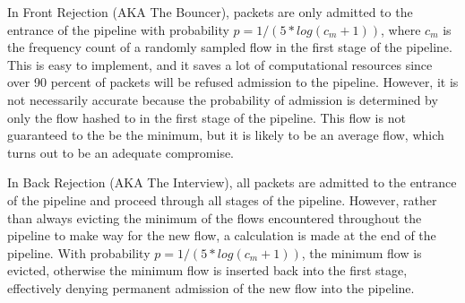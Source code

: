 In Front Rejection (AKA The Bouncer), packets are only admitted to the entrance of the pipeline with probability $p = 1 / (5*log(c_m + 1))$, where $c_m$ is the frequency count of a randomly sampled flow in the first stage of the pipeline. This is easy to implement, and it saves a lot of computational resources since over 90 percent of packets will be refused admission to the pipeline. However, it is not necessarily accurate because the probability of admission is determined by only the flow hashed to in the first stage of the pipeline. This flow is not guaranteed to the be the minimum, but it is likely to be an average flow, which turns out to be an adequate compromise. 

In Back Rejection (AKA The Interview), all packets are admitted to the entrance of the pipeline and proceed through all stages of the pipeline. However, rather than always evicting the minimum of the flows encountered throughout the pipeline to make way for the new flow, a calculation is made at the end of the pipeline. With probability $p = 1 / (5*log(c_m + 1))$, the minimum flow is evicted, otherwise the minimum flow is inserted back into the first stage, effectively denying permanent admission of the new flow into the pipeline. 



